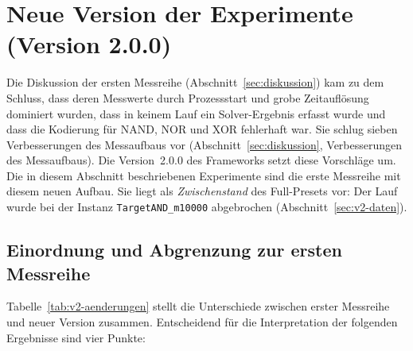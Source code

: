 \documentclass[a4paper,12pt]{article}
\theoremstyle{definition}
\begin{document}
\section{Neue Version der Experimente (Version 2.0.0)}
\label{sec:v2}

\noindent{}

\medskip

Die Diskussion der ersten Messreihe (Abschnitt~\ref{sec:diskussion}) kam zu dem Schluss, dass deren Messwerte durch Prozessstart und grobe Zeitauflösung dominiert wurden, dass in keinem Lauf ein Solver-Ergebnis erfasst wurde und dass die Kodierung für NAND, NOR und XOR fehlerhaft war. Sie schlug sieben Verbesserungen des Messaufbaus vor (Abschnitt~\ref{sec:diskussion}, Verbesserungen des Messaufbaus). Die Version~2.0.0 des Frameworks setzt diese Vorschläge um. Die in diesem Abschnitt beschriebenen Experimente sind die erste Messreihe mit diesem neuen Aufbau. Sie liegt als \emph{Zwischenstand} des Full-Presets vor: Der Lauf wurde bei der Instanz \texttt{TargetAND\_m10000} abgebrochen (Abschnitt~\ref{sec:v2-daten}).

\subsection{Einordnung und Abgrenzung zur ersten Messreihe}
\label{sec:v2-einordnung}

Tabelle~\ref{tab:v2-aenderungen} stellt die Unterschiede zwischen erster Messreihe und neuer Version zusammen. Entscheidend für die Interpretation der folgenden Ergebnisse sind vier Punkte:
\end{document}
